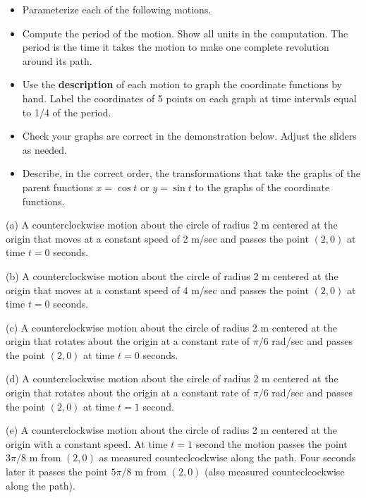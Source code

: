\documentclass{ximera}
\begin{document}
\begin{example}     \label{Ex1:Graphs}
\begin{itemize}

\item{Parameterize each of the following motions.}

\item{Compute the period of the motion. Show all units in the computation. The period is the time it takes the motion to make one complete revolution around its path.}

\item{Use the {\bf description} of each motion to graph the coordinate functions by hand. Label the coordinates of 5 points on each graph at time intervals equal to 1/4 of the period.}

\item{Check your graphs are correct in the demonstration below. Adjust the sliders as needed.}

\item{Describe, in the correct order, the transformations that take the graphs of the parent functions $x=\cos t$ or $y=\sin t$ to the graphs of the coordinate functions.}

\end{itemize}

(a) A counterclockwise motion about the circle of radius 2 m centered at the origin that moves at a constant speed of 2 m/sec and passes the point $(2,0)$ at time $t=0$ seconds.

(b) A counterclockwise motion about the circle of radius 2 m centered at the origin that moves at a constant speed of 4 m/sec and passes the point $(2,0)$ at time $t=0$ seconds.

(c) A counterclockwise motion about the circle of radius 2 m centered at the origin that rotates about the origin at a constant rate of $\pi/6$ rad/sec and passes the point $(2,0)$ at time $t=0$ seconds.

(d) A counterclockwise motion about the circle of radius 2 m centered at the origin that rotates about the origin at a constant rate of $\pi/6$ rad/sec and passes the point $(2,0)$ at time $t=1$ second.

(e) A counterclockwise motion about the circle of radius 2 m centered at the origin with a constant speed. At time $t=1$ second the motion passes the point $3\pi/8$ m from $(2,0)$ as measured counteclcockwise along the path. Four seconds later it passes the point $5\pi/8$ m from $(2,0)$ (also measured counteclcockwise along the path).

\begin{exploration}
 
\begin{onlineOnly}
    \begin{center}
\end{center}
\end{onlineOnly}
\end{exploration}
\end{example}
\end{document}
